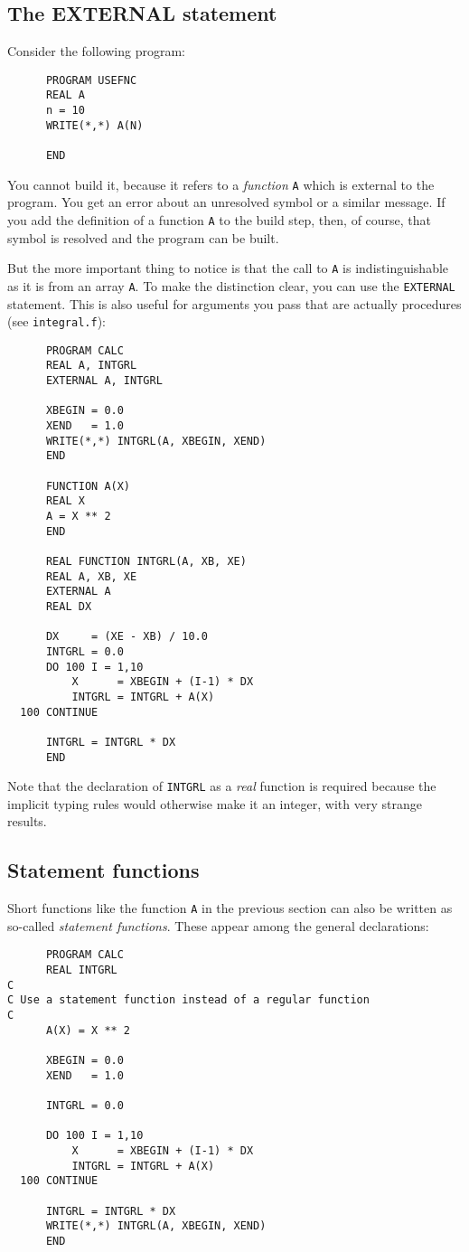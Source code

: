 \subsection{The EXTERNAL statement}
Consider the following program:
%
\begin{verbatim}
      PROGRAM USEFNC
      REAL A
      n = 10
      WRITE(*,*) A(N)

      END
\end{verbatim}

You cannot build it, because it refers to a \emph{function} \verb+A+ which is external
to the program. You get an error about an unresolved symbol or a similar message.
If you add the definition of a function \verb+A+ to the build step, then, of course,
that symbol is resolved and the program can be built.

But the more important thing to notice is that the call to \verb+A+ is indistinguishable
as it is from an array \verb+A+. To make the distinction clear, you can use the
\verb+EXTERNAL+ statement. This is also useful for arguments you pass that are actually
procedures (see \verb+integral.f+):
%
\begin{verbatim}
      PROGRAM CALC
      REAL A, INTGRL
      EXTERNAL A, INTGRL

      XBEGIN = 0.0
      XEND   = 1.0
      WRITE(*,*) INTGRL(A, XBEGIN, XEND)
      END

      FUNCTION A(X)
      REAL X
      A = X ** 2
      END

      REAL FUNCTION INTGRL(A, XB, XE)
      REAL A, XB, XE
      EXTERNAL A
      REAL DX

      DX     = (XE - XB) / 10.0
      INTGRL = 0.0
      DO 100 I = 1,10
          X      = XBEGIN + (I-1) * DX
          INTGRL = INTGRL + A(X)
  100 CONTINUE

      INTGRL = INTGRL * DX
      END
\end{verbatim}
%
Note that the declaration of \verb+INTGRL+ as a \emph{real} function is required
because the implicit typing rules would otherwise make it an integer, with very
strange results.


\subsection{Statement functions}
Short functions like the function \verb+A+ in the previous section can also be
written as so-called \emph{statement functions}. These appear among the general
declarations:
\begin{verbatim}
      PROGRAM CALC
      REAL INTGRL
C
C Use a statement function instead of a regular function
C
      A(X) = X ** 2

      XBEGIN = 0.0
      XEND   = 1.0

      INTGRL = 0.0

      DO 100 I = 1,10
          X      = XBEGIN + (I-1) * DX
          INTGRL = INTGRL + A(X)
  100 CONTINUE

      INTGRL = INTGRL * DX
      WRITE(*,*) INTGRL(A, XBEGIN, XEND)
      END
\end{verbatim}

